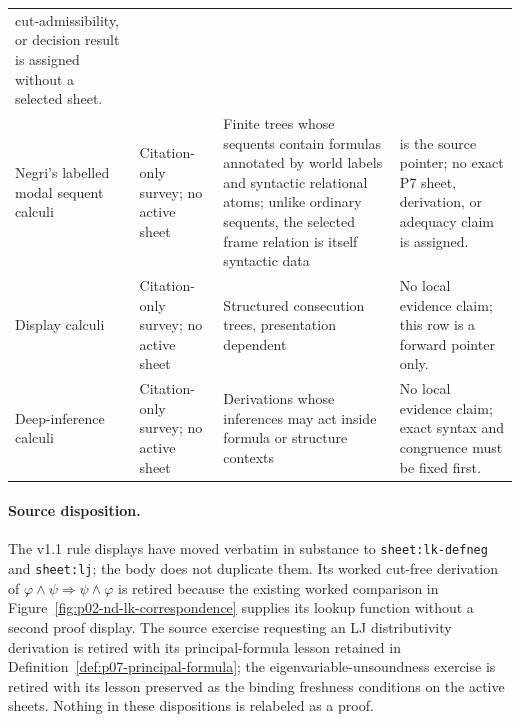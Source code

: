 \begin{longtable}{@{}p{}p{}p{}
  p{}@{}}
cut-admissibility, or decision result is assigned without a selected sheet. \\
Negri's labelled modal sequent calculi & Citation-only survey; no active sheet
& Finite trees whose sequents contain formulas annotated by world labels and
syntactic relational atoms; unlike ordinary sequents, the selected frame
relation is itself syntactic data & \cite{Negri2005} is the source
pointer; no exact P7 sheet, derivation, or adequacy claim is assigned. \\
Display calculi & Citation-only survey; no active sheet & Structured
consecution trees, presentation dependent & No local evidence claim; this row
is a forward pointer only. \\
Deep-inference calculi & Citation-only survey; no active sheet & Derivations
whose inferences may act inside formula or structure contexts & No local
evidence claim; exact syntax and congruence must be fixed first. \\
\bottomrule
\end{longtable}
\endgroup

\paragraph{Source disposition.}
The v1.1 rule displays have moved verbatim in substance to
\texttt{sheet:lk-defneg} and \texttt{sheet:lj}; the body does not duplicate
them.  Its worked cut-free derivation of
\(\varphi\land\psi\Rightarrow\psi\land\varphi\) is retired because the
existing worked comparison in Figure~\ref{fig:p02-nd-lk-correspondence}
supplies its lookup function without a second proof display.  The source
exercise requesting an LJ distributivity derivation is retired with its
principal-formula lesson retained in
Definition~\ref{def:p07-principal-formula}; the eigenvariable-unsoundness
exercise is retired with its lesson preserved as the binding freshness
conditions on the active sheets.  Nothing in these dispositions is relabeled
as a proof.
